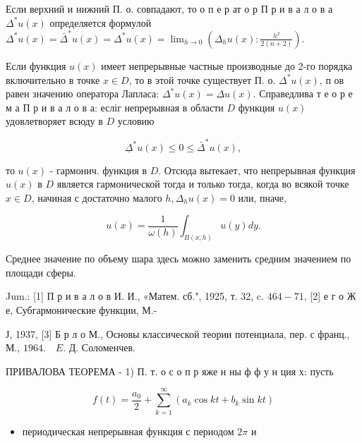 \documentclass[10pt]{article}
\begin{document}
Если верхний и нижний П. о. совпадают, то о п е р ат о р П р и в а л о в а $\Delta^{*} u(x)$ определяется формулой $\Delta^{*} u(x)=\bar{\Delta}^{*} u(x)=\Delta^{*} u(x)=\lim _{h \rightarrow 0}\left(\Delta_{h} u(x): \frac{h^{2}}{2(n+2)}\right)$.



Если функция $u(x)$ имеет непрерывные частные производные до 2-го порядка включительно в точке $x \in D$, то в этой точке существует П. о. $\Delta^{*} u(x)$, п ов равен значению оператора Лапласа: $\Delta^{*} u(x)=\Delta u(x)$. Справедлива т е о р е м а П р и в а л о в а: есліг непрерывная в области $D$ функция $u(x)$ удовлетворяет всюду в $D$ условию



\[

\underline{\Delta}^{*} u(x) \leqslant 0 \leqslant \bar{\Delta}^{*} u(x),

\]



то $u(x)$ - гармонич. функция в $D$. Отсюда вытекает, что непрерывная функция $u(x)$ в $D$ является гармонической тогда и только тогда, когда во всякой точке $x \in D$, начиная с достаточно малого $h, \Delta_{h} u(x)=0$ или, пначе,



\[

u(x)=\frac{1}{\omega(h)} \int_{B(x ; h)} u(y) d y .

\]



Среднее значение по объему шара здесь можно заменить средним значением по площади сферы.



Jum.: [1] П р и в а л о в И. И., «Матем. сб.", 1925, т. 32, c. $464-71$, [2] е г о Ж е, Субгармонические функции, М.-

Ј, 1937, [3] Б р л о М., Основы классической теории потенциала, пер. с франц., М., $1964 . \quad E$. Д. Соломенчев.



ПРИВАЛОВА ТЕОРЕМА - 1) П. т. о с о п р яже н ны ф ф у н ция х: пусть



\[

f(t)=\frac{a_{0}}{2}+\sum_{k=1}^{\infty}\left(a_{k} \cos k t+b_{k} \sin k t\right)

\]



\begin{itemize}

  \item периодическая непрерывная функция с периодом $2 \pi$ и

\end{itemize}
\end{document}
